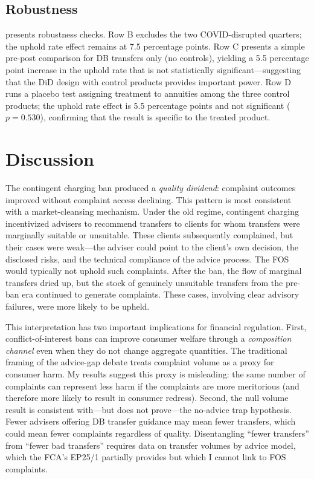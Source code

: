 \documentclass[12pt]{article}
\begin{document}
\subsection{Robustness}



 presents robustness checks. Row B excludes the two COVID-disrupted quarters; the uphold rate effect remains at 7.5 percentage points. Row C presents a simple pre-post comparison for DB transfers only (no controls), yielding a 5.5 percentage point increase in the uphold rate that is not statistically significant---suggesting that the DiD design with control products provides important power. Row D runs a placebo test assigning treatment to annuities among the three control products; the uphold rate effect is 5.5 percentage points and not significant ($p = 0.530$), confirming that the result is specific to the treated product.


\section{Discussion}

The contingent charging ban produced a \textit{quality dividend}: complaint outcomes improved without complaint access declining. This pattern is most consistent with a market-cleansing mechanism. Under the old regime, contingent charging incentivized advisers to recommend transfers to clients for whom transfers were marginally suitable or unsuitable. These clients subsequently complained, but their cases were weak---the adviser could point to the client's own decision, the disclosed risks, and the technical compliance of the advice process. The FOS would typically not uphold such complaints. After the ban, the flow of marginal transfers dried up, but the stock of genuinely unsuitable transfers from the pre-ban era continued to generate complaints. These cases, involving clear advisory failures, were more likely to be upheld.

This interpretation has two important implications for financial regulation. First, conflict-of-interest bans can improve consumer welfare through a \textit{composition channel} even when they do not change aggregate quantities. The traditional framing of the advice-gap debate treats complaint volume as a proxy for consumer harm. My results suggest this proxy is misleading: the same number of complaints can represent less harm if the complaints are more meritorious (and therefore more likely to result in consumer redress). Second, the null volume result is consistent with---but does not prove---the no-advice trap hypothesis. Fewer advisers offering DB transfer guidance may mean fewer transfers, which could mean fewer complaints regardless of quality. Disentangling ``fewer transfers'' from ``fewer bad transfers'' requires data on transfer volumes by advice model, which the FCA's EP25/1 partially provides but which I cannot link to FOS complaints.
\end{document}
